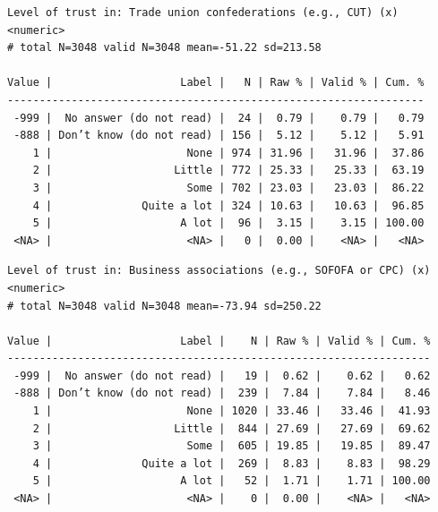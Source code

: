 \documentclass[
  letterpaper,
  DIV=11,
  numbers=noendperiod]{scrreprt}
\newenvironment{Shaded}{\begin{snugshade}}{\end{snugshade}}
\newcommand{\FunctionTok}[1]{\textcolor[rgb]{0.28,0.35,0.67}{#1}}
\newcommand{\NormalTok}[1]{\textcolor[rgb]{0.00,0.23,0.31}{#1}}
\newcommand{\SpecialCharTok}[1]{\textcolor[rgb]{0.37,0.37,0.37}{#1}}
\begin{document}
\begin{verbatim}
Level of trust in: Trade union confederations (e.g., CUT) (x) <numeric> 
# total N=3048 valid N=3048 mean=-51.22 sd=213.58

Value |                    Label |   N | Raw % | Valid % | Cum. %
-----------------------------------------------------------------
 -999 |  No answer (do not read) |  24 |  0.79 |    0.79 |   0.79
 -888 | Don’t know (do not read) | 156 |  5.12 |    5.12 |   5.91
    1 |                     None | 974 | 31.96 |   31.96 |  37.86
    2 |                   Little | 772 | 25.33 |   25.33 |  63.19
    3 |                     Some | 702 | 23.03 |   23.03 |  86.22
    4 |              Quite a lot | 324 | 10.63 |   10.63 |  96.85
    5 |                    A lot |  96 |  3.15 |    3.15 | 100.00
 <NA> |                     <NA> |   0 |  0.00 |    <NA> |   <NA>
\end{verbatim}

\begin{Shaded}
\end{Shaded}

\begin{verbatim}
Level of trust in: Business associations (e.g., SOFOFA or CPC) (x) <numeric> 
# total N=3048 valid N=3048 mean=-73.94 sd=250.22

Value |                    Label |    N | Raw % | Valid % | Cum. %
------------------------------------------------------------------
 -999 |  No answer (do not read) |   19 |  0.62 |    0.62 |   0.62
 -888 | Don’t know (do not read) |  239 |  7.84 |    7.84 |   8.46
    1 |                     None | 1020 | 33.46 |   33.46 |  41.93
    2 |                   Little |  844 | 27.69 |   27.69 |  69.62
    3 |                     Some |  605 | 19.85 |   19.85 |  89.47
    4 |              Quite a lot |  269 |  8.83 |    8.83 |  98.29
    5 |                    A lot |   52 |  1.71 |    1.71 | 100.00
 <NA> |                     <NA> |    0 |  0.00 |    <NA> |   <NA>
\end{verbatim}

\begin{Shaded}
\end{Shaded}
\end{document}
